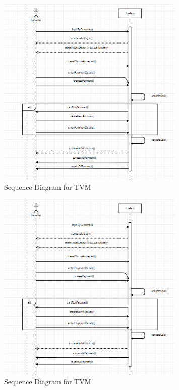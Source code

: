\documentclass[11pt, english]{report}
\begin{document}

\begin{figure}[H]
  
  \includegraphics[width=0.8\textwidth]{images/ssd.png}
  \centering
   \caption{Sequence Diagram for TVM}

\end{figure}

\begin{figure}[H]
  
  \includegraphics[width=0.8\textwidth]{images/SSD.PNG}
  \centering

   \caption{Sequence Diagram for TVM}

\end{figure}
\end{document}
